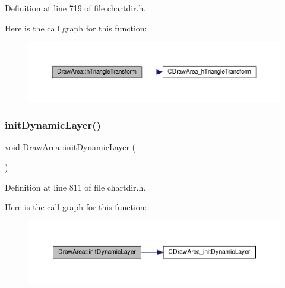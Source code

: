 Definition at line 719 of file chartdir.\+h.

Here is the call graph for this function\+:
\nopagebreak
\begin{figure}[H]
\begin{center}
\leavevmode
\includegraphics[width=350pt]{class_draw_area_a24e00fc723cbe7b64fad7c51e4c10577_cgraph}
\end{center}
\end{figure}
\mbox{\label{class_draw_area_ac516d1144130cf60965201a708a08cc5}} 
\subsubsection{\texorpdfstring{init\+Dynamic\+Layer()}{initDynamicLayer()}}
{\footnotesize\ttfamily void Draw\+Area\+::init\+Dynamic\+Layer (\begin{DoxyParamCaption}{ }\end{DoxyParamCaption})\hspace{0.3cm}{\ttfamily [inline]}}



Definition at line 811 of file chartdir.\+h.

Here is the call graph for this function\+:
\nopagebreak
\begin{figure}[H]
\begin{center}
\leavevmode
\includegraphics[width=350pt]{class_draw_area_ac516d1144130cf60965201a708a08cc5_cgraph}
\end{center}
\end{figure}
\mbox{\label{class_draw_area_a92722dabd76ce0427c9f5033f0b5754e}} 
